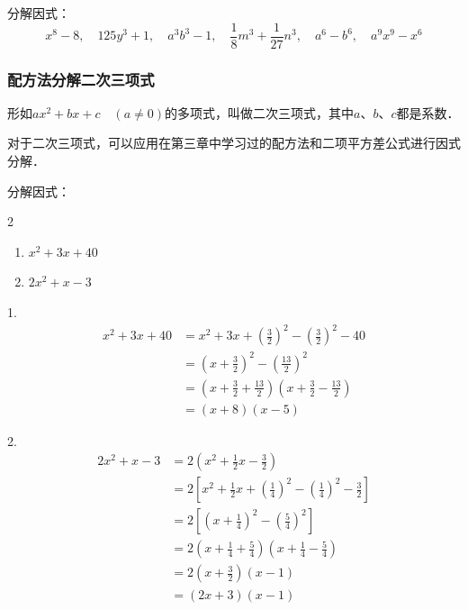 \begin{ex}
    分解因式：
\[x^8-8,\quad 125y^3+1,\quad  a^3b^3-1,\quad \frac{1}{8}m^3+\frac{1}{27}n^3,\quad a^6-b^6,\quad a^9x^9-x^6\]
\end{ex}

\subsubsection{配方法分解二次三项式}
形如$ax^2+bx+c\quad (a\ne 0)$的多项式，叫做二次三项式，其中$a$、$b$、$c$都是系数．

对于二次三项式，可以应用在第三章中学习过的配方法和二项平方差公式进行因式分解．
\begin{example}
    分解因式：
\begin{multicols}{2}
    \begin{enumerate}
        \item $x^2+3x+40$
        \item $2x^2+x-3$
    \end{enumerate}
\end{multicols}
\end{example}

\begin{solution}
1.\[\begin{split}
    x^2+3x+40&=x^2+3x+\left(\frac{3}{2}\right)^2-\left(\frac{3}{2}\right)^2-40\\
    &=\left(x+\frac{3}{2}\right)^2-\left(\frac{13}{2}\right)^2\\
    &=\left(x+\frac{3}{2}+\frac{13}{2}\right)\left(x+\frac{3}{2}-\frac{13}{2}\right)\\
    &=(x+8)(x-5)
\end{split}\]

2.\[\begin{split}
    2x^2+x-3&=2\left(x^2+\frac{1}{2}x-\frac{3}{2}\right)\\
    &=2\left[x^2+\frac{1}{2}x+\left(\frac{1}{4}\right)^2-\left(\frac{1}{4}\right)^2-\frac{3}{2} \right]\\
    &=2\left[\left(x+\frac{1}{4}\right)^2-\left(\frac{5}{4}\right)^2\right]\\
    &=2\left(x+\frac{1}{4}+\frac{5}{4}\right)
   \left(x+\frac{1}{4}-\frac{5}{4}\right) \\
&=2\left(x+\frac{3}{2}\right)\left(x-1\right)\\
&=(2x+3)(x-1)
\end{split}\]
\end{solution}

